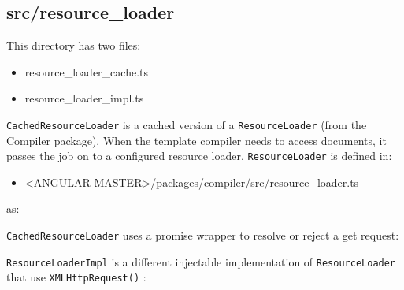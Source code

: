 \subsection{src/resource\_loader}

This directory has two files:

\begin{itemize}
  \item resource\_loader\_cache.ts
  \item resource\_loader\_impl.ts
\end{itemize}

\texttt{CachedResourceLoader}
is a cached version of a
\texttt{ResourceLoader}
(from the Compiler
package). When the template compiler needs to access documents, it passes the job
on to a configured resource loader.
\texttt{ResourceLoader}
is defined in:

\begin{itemize}
  \item \href{https://github.com/angular/angular/blob/master/packages/compiler/src/resource_loader.ts}
        {<ANGULAR-MASTER>/packages/compiler/src/resource\_loader.ts}
\end{itemize}

as:



\texttt{CachedResourceLoader}
uses a promise wrapper to resolve or reject a get request:



\texttt{ResourceLoaderImpl}
is a different injectable implementation of
\texttt{ResourceLoader}
that
use
\texttt{XMLHttpRequest()}
:


